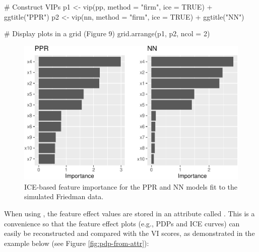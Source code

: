 \begin{Schunk}
\begin{Sinput}
# Construct VIPs
p1 <- vip(pp, method = "firm", ice = TRUE) + ggtitle("PPR")
p2 <- vip(nn, method = "firm", ice = TRUE) + ggtitle("NN")

# Display plots in a grid (Figure 9)
grid.arrange(p1, p2, ncol = 2)
\end{Sinput}
\begin{figure}[!htb]

{\centering \includegraphics[width=0.7\linewidth]{greenwell-boehmke_files/figure-latex/vip-ice-ppr-nn-1} 

}

\caption[ICE-based feature importance for the PPR and NN models fit to the simulated Friedman data]{ICE-based feature importance for the PPR and NN models fit to the simulated Friedman data.}\label{fig:vip-ice-ppr-nn}
\end{figure}
\end{Schunk}

When using , the feature effect values are stored
in an attribute called . This is a convenience so that
the feature effect plots (e.g., PDPs and ICE curves) can easily be
reconstructed and compared with the VI scores, as demonstrated in the
example below (see Figure \ref{fig:pdp-from-attr}):

